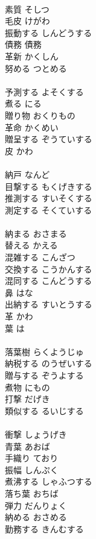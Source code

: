 \documentclass[8pt]{extreport}
\begin{document}
\begin{CJK}{UTF8}{min}
\\	素質	そしつ	
\\	毛皮	けがわ	
\\	振動する	しんどうする	
\\	債務	債務	
\\	革新	かくしん	
\\	努める	つとめる	
\\	[和語]
\\	予測する	よそくする	
\\	煮る	にる	
\\	贈り物	おくりもの	
\\	革命	かくめい	
\\	贈呈する	ぞうていする	
\\	皮	かわ	
\\	[和語]
\\	納戸	なんど	
\\	目撃する	もくげきする	
\\	推測する	すいそくする	
\\	測定する	そくていする	
\\	[和語]
\\	納まる	おさまる	
\\	替える	かえる	
\\	混雑する	こんざつ	
\\	交換する	こうかんする	
\\	混同する	こんどうする	
\\	鼻	はな	
\\	出納する	すいとうする	
\\	革	かわ	
\\	葉	は	
\\	[漢語]
\\	落葉樹	らくようじゅ	
\\	納税する	のうぜいする	
\\	贈与する	ぞうよする	
\\	煮物	にもの	
\\	打撃	だげき	
\\	類似する	るいじする	
\\	[漢語]
\\	衝撃	しょうげき	
\\	青葉	あおば	
\\	手織り	ており	
\\	振幅	しんぷく	
\\	煮沸する	しゃふつする	
\\	落ち葉	おちば	
\\	弾力	だんりょく	
\\	納める	おさめる	
\\	勤務する	きんむする	

\end{CJK}
\end{document}
